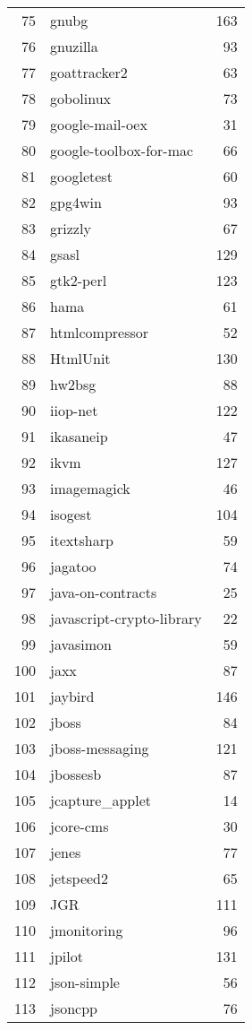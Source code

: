 \begin{table}[ht]
\begin{tabular}{rlr}
  75 & gnubg & 163 \\ 
  76 & gnuzilla &  93 \\ 
  77 & goattracker2 &  63 \\ 
  78 & gobolinux &  73 \\ 
  79 & google-mail-oex &  31 \\ 
  80 & google-toolbox-for-mac &  66 \\ 
  81 & googletest &  60 \\ 
  82 & gpg4win &  93 \\ 
  83 & grizzly &  67 \\ 
  84 & gsasl & 129 \\ 
  85 & gtk2-perl & 123 \\ 
  86 & hama &  61 \\ 
  87 & htmlcompressor &  52 \\ 
  88 & HtmlUnit & 130 \\ 
  89 & hw2bsg &  88 \\ 
  90 & iiop-net & 122 \\ 
  91 & ikasaneip &  47 \\ 
  92 & ikvm & 127 \\ 
  93 & imagemagick &  46 \\ 
  94 & isogest & 104 \\ 
  95 & itextsharp &  59 \\ 
  96 & jagatoo &  74 \\ 
  97 & java-on-contracts &  25 \\ 
  98 & javascript-crypto-library &  22 \\ 
  99 & javasimon &  59 \\ 
  100 & jaxx &  87 \\ 
  101 & jaybird & 146 \\ 
  102 & jboss &  84 \\ 
  103 & jboss-messaging & 121 \\ 
  104 & jbossesb &  87 \\ 
  105 & jcapture\_applet &  14 \\ 
  106 & jcore-cms &  30 \\ 
  107 & jenes &  77 \\ 
  108 & jetspeed2 &  65 \\ 
  109 & JGR & 111 \\ 
  110 & jmonitoring &  96 \\ 
  111 & jpilot & 131 \\ 
  112 & json-simple &  56 \\ 
  113 & jsoncpp &  76 \\ 

\end{tabular}
\end{table}
